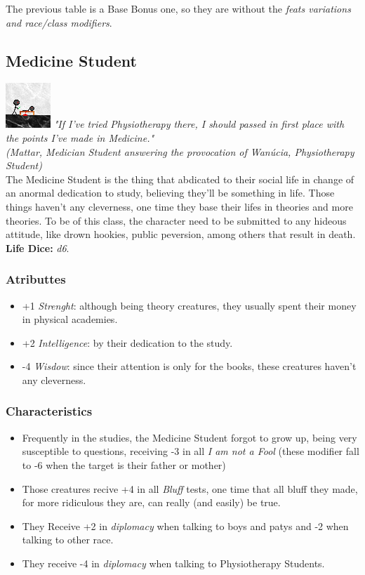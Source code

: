 \documentclass[ letterpaper,12pt]{article}
\begin{document}
The previous table is a Base Bonus one, so they are without the {\it feats variations and race/class modifiers}.\\

\subsection{Medicine Student}
\includegraphics{../data/classes/Img/medicina.png}
{\it "If  I've  tried  Physiotherapy  there, I should passed  in first place with the points I've made in Medicine."\\
(Mattar, Medician  Student  answering the provocation   of  Wanúcia,  Physiotherapy Student)}\\

The Medicine Student is the thing that abdicated to their social life in change of an anormal dedication to study, believing they'll be something in life. Those things haven't any cleverness, one time they base their lifes in theories and more theories. To be of this class, the character need to be submitted to any hideous attitude, like drown hookies, public peversion, among others that result in death.\\

{\bf Life Dice:} {\it d6}.

\subsubsection{Atributtes}
\begin{itemize}
\item{+1 {\it Strenght}: although  being  theory  creatures,  they usually  spent  their  money  in physical academies.}
\item{+2 {\it Intelligence}: by  their  dedication  to  the  study.}
\item{-4 {\it Wisdow}: since their attention is only for the books, these  creatures  haven't any cleverness.}
\end{itemize}

\subsubsection{Characteristics}
\begin{itemize}
\item{Frequently in the studies, the Medicine Student forgot to grow up, being very susceptible to questions, receiving -3 in all {\it I am not a Fool} (these modifier fall to -6 when the target is their father  or mother)}
\item{Those creatures recive  +4 in  all  {\it Bluff} tests, one time that all bluff they made, for more ridiculous they are, can  really (and easily) be true.}
\item{They Receive +2 in {\it diplomacy} when talking to boys and patys and -2 when talking to other race.}
\item{They receive -4 in {\it diplomacy} when talking to Physiotherapy Students.}
\end{itemize}
\end{document}
